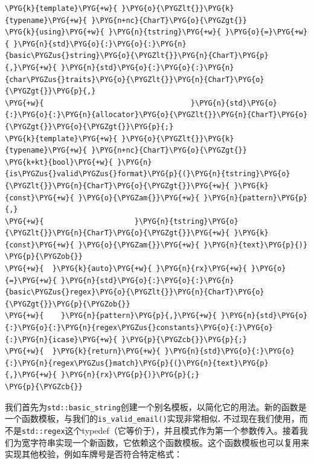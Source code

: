 
\begin{codeblockbg}
\begin{Verbatim}[commandchars=\\\{\},breaklines=true,breakanywhere=true,fontsize=\codefont,xleftmargin=17bp]
\PYG{k}{template}\PYG{+w}{ }\PYG{o}{\PYGZlt{}}\PYG{k}{typename}\PYG{+w}{ }\PYG{n+nc}{CharT}\PYG{o}{\PYGZgt{}}
\PYG{k}{using}\PYG{+w}{ }\PYG{n}{tstring}\PYG{+w}{ }\PYG{o}{=}\PYG{+w}{ }\PYG{n}{std}\PYG{o}{:}\PYG{o}{:}\PYG{n}{basic\PYGZus{}string}\PYG{o}{\PYGZlt{}}\PYG{n}{CharT}\PYG{p}{,}\PYG{+w}{ }\PYG{n}{std}\PYG{o}{:}\PYG{o}{:}\PYG{n}{char\PYGZus{}traits}\PYG{o}{\PYGZlt{}}\PYG{n}{CharT}\PYG{o}{\PYGZgt{}}\PYG{p}{,}
\PYG{+w}{                                  }\PYG{n}{std}\PYG{o}{:}\PYG{o}{:}\PYG{n}{allocator}\PYG{o}{\PYGZlt{}}\PYG{n}{CharT}\PYG{o}{\PYGZgt{}}\PYG{o}{\PYGZgt{}}\PYG{p}{;}
\PYG{k}{template}\PYG{+w}{ }\PYG{o}{\PYGZlt{}}\PYG{k}{typename}\PYG{+w}{ }\PYG{n+nc}{CharT}\PYG{o}{\PYGZgt{}}
\PYG{k+kt}{bool}\PYG{+w}{ }\PYG{n}{is\PYGZus{}valid\PYGZus{}format}\PYG{p}{(}\PYG{n}{tstring}\PYG{o}{\PYGZlt{}}\PYG{n}{CharT}\PYG{o}{\PYGZgt{}}\PYG{+w}{ }\PYG{k}{const}\PYG{+w}{ }\PYG{o}{\PYGZam{}}\PYG{+w}{ }\PYG{n}{pattern}\PYG{p}{,}
\PYG{+w}{                     }\PYG{n}{tstring}\PYG{o}{\PYGZlt{}}\PYG{n}{CharT}\PYG{o}{\PYGZgt{}}\PYG{+w}{ }\PYG{k}{const}\PYG{+w}{ }\PYG{o}{\PYGZam{}}\PYG{+w}{ }\PYG{n}{text}\PYG{p}{)}
\PYG{p}{\PYGZob{}}
\PYG{+w}{  }\PYG{k}{auto}\PYG{+w}{ }\PYG{n}{rx}\PYG{+w}{ }\PYG{o}{=}\PYG{+w}{ }\PYG{n}{std}\PYG{o}{:}\PYG{o}{:}\PYG{n}{basic\PYGZus{}regex}\PYG{o}{\PYGZlt{}}\PYG{n}{CharT}\PYG{o}{\PYGZgt{}}\PYG{p}{\PYGZob{}}
\PYG{+w}{    }\PYG{n}{pattern}\PYG{p}{,}\PYG{+w}{ }\PYG{n}{std}\PYG{o}{:}\PYG{o}{:}\PYG{n}{regex\PYGZus{}constants}\PYG{o}{:}\PYG{o}{:}\PYG{n}{icase}\PYG{+w}{ }\PYG{p}{\PYGZcb{}}\PYG{p}{;}
\PYG{+w}{  }\PYG{k}{return}\PYG{+w}{ }\PYG{n}{std}\PYG{o}{:}\PYG{o}{:}\PYG{n}{regex\PYGZus{}match}\PYG{p}{(}\PYG{n}{text}\PYG{p}{,}\PYG{+w}{ }\PYG{n}{rx}\PYG{p}{)}\PYG{p}{;}
\PYG{p}{\PYGZcb{}}
\end{Verbatim}
\end{codeblockbg}



我们首先为\texttt{std::\allowbreak{}basic\_\allowbreak{}string}创建一个别名模板，以简化它的用法。新的函数是一个函数模板，与我们的\texttt{is\_\allowbreak{}valid\_\allowbreak{}email()}实现非常相似\textbf{. }不过现在我们使用，而不是\texttt{std::\allowbreak{}regex}这个typedef（它等价于），并且模式作为第一个参数传入。接着我们为宽字符串实现一个新函数，它依赖这个函数模板。这个函数模板也可以复用来实现其他校验，例如车牌号是否符合特定格式：


